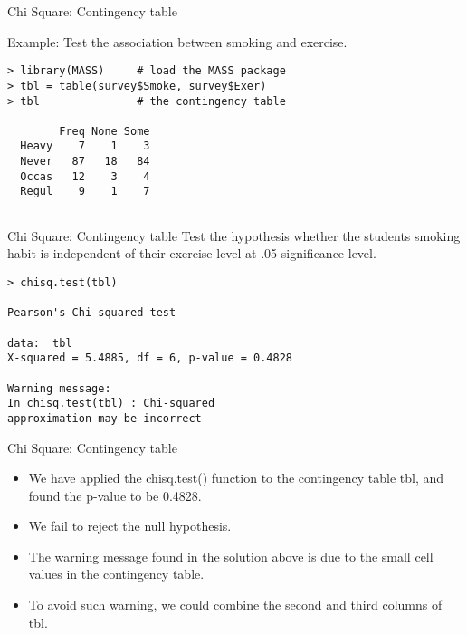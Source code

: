 \documentclass[pdf,default,slideColor,colorBG]{prosper}
\begin{document}

\begin{slide}{Chi Square: Contingency table}

Example: Test the association between smoking and exercise.

\begin{verbatim}
> library(MASS)     # load the MASS package
> tbl = table(survey$Smoke, survey$Exer)
> tbl               # the contingency table

        Freq None Some
  Heavy    7    1    3
  Never   87   18   84
  Occas   12    3    4
  Regul    9    1    7


\end{verbatim}
\end{slide}

\begin{slide}{Chi Square: Contingency table}
Test the hypothesis whether the students smoking habit is independent of their exercise level at .05 significance level.
\begin{verbatim}
> chisq.test(tbl)

Pearson's Chi-squared test

data:  tbl
X-squared = 5.4885, df = 6, p-value = 0.4828

Warning message:
In chisq.test(tbl) : Chi-squared
approximation may be incorrect

\end{verbatim}
\end{slide}



\begin{slide}{Chi Square: Contingency table}
\begin{itemize}
\item We have applied the chisq.test() function to the contingency table tbl, and found the p-value to be 0.4828.
\item We fail to reject the null hypothesis.


\item The warning message found in the solution above is due to the small cell values in the contingency table. \item To avoid such warning, we could combine the second and third columns of tbl.
\end{itemize}
\end{slide}
\end{document}
